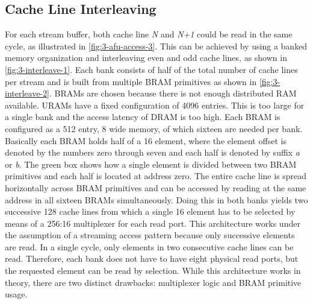 \subsection{Cache Line Interleaving}
For each stream buffer, both cache line \textit{N} and \textit{N+1} could be read in the same cycle, as illustrated in \autoref{fig:3-afu-access-3}. This can be achieved by using a banked memory organization and interleaving even and odd cache lines, as shown in \autoref{fig:3-interleave-1}. Each bank consists of half of the total number of cache lines per stream and is built from multiple BRAM primitives as shown in \autoref{fig:3-interleave-2}. BRAMs are chosen because there is not enough distributed RAM available. URAMs have a fixed configuration of 4096 entries. This is too large for a single bank and the access latency of DRAM is too high. Each BRAM is configured as a 512 entry, \SI{8}{\byte} wide memory, of which sixteen are needed per bank. Basically each BRAM holds half of a \SI{16}{\byte} element, where the element offset is denoted by the numbers zero through seven and each half is denoted by suffix \textit{a} or \textit{b}. The green box shows how a single element is divided between two BRAM primitives and each half is located at address zero. The entire cache line is spread horizontally across BRAM primitives and can be accessed by reading at the same address in all sixteen BRAMs simultaneously. Doing this in both banks yields two successive \SI{128}{\byte} cache lines from which a single \SI{16}{\byte} element has to be selected by means of a \SI{256}{\byte}:\SI{16}{\byte} multiplexer for each read port. This architecture works under the assumption of a streaming access pattern because only successive elements are read. In a single cycle, only elements in two consecutive cache lines can be read. Therefore, each bank does not have to have eight physical read ports, but the requested element can be read by selection. While this architecture works in theory, there are two distinct drawbacks: multiplexer logic and BRAM primitive usage.


